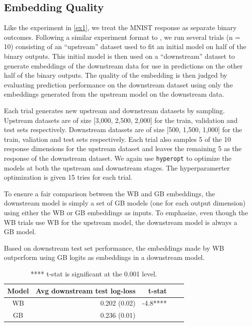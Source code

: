 \documentclass{article}
\begin{document}
\subsection{Embedding Quality}

Like the experiment in \ref{ex1}, we treat the MNIST response as separate binary outcomes. Following a similar experiment format to \cite{levin2022transfer}, we run several trials (n = 10) consisting of an ``upstream'' dataset used to fit an initial model on half of the binary outputs. This initial model is then used on a ``downstream'' dataset to generate embeddings of the downstream data for use in predictions on the other half of the binary outputs. The quality of the embedding is then judged by evaluating prediction performance on the downstream dataset using only the embeddings generated from the upstream model on the downstream data.

Each trial generates new upstream and downstream datasets by sampling. Upstream datasets are of size [3{,}000, 2{,}500, 2{,}000] for the train, validation and test sets respectively.  Downstream datasets are of size [500, 1{,}500, 1{,}000] for the train, valiation and test sets respectively. Each trial also samples 5 of the 10 response dimensions for the upstream dataset and leaves the remaining 5 as the response of the downstream dataset. We again use \texttt{hyperopt} to optimize the models at both the upstream and downstream stages. The hyperparamerter optimization is given 15 tries for each trial.

To ensure a fair comparison between the WB and GB embeddings, the downstream model is simply a set of GB models (one for each output dimension) using either the WB or GB embeddings as inputs.  To emphasize, even though the WB trials use WB for the upstream model, the downstream model is always a GB model.

Based on downstream test set performance, the embeddings made by WB outperform using GB logits as embeddings in a downstream model.
\begin{table}[htbp]
    \centering
    \begin{tabular}{c|r|r|r|r}
        Model & Avg downstream test log-loss & t-stat \\
        \hline
        WB & 0.202 (0.02) & -4.8**** \\
        GB & 0.236 (0.01) &          
    \end{tabular}
    \caption{**** t-stat is significant at the 0.001 level.}
\end{table}
\end{document}
